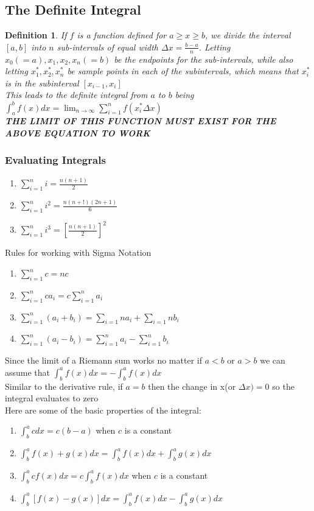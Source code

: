 \documentclass[10pt,a4paper]{article}
\newtheorem{definition}{Definition}
\begin{document}
	\subsection{The Definite Integral}
	\begin{definition}
		If $f$ is a function defined for $a\geq x \geq b$, we divide the interval $[a,b]$ into $n$ sub-intervals of equal width $\Delta{x} = \frac{b-a}{n}$. Letting $x_{0}(=a),x_{1}, x_{2}, x_{n}(=b)$ be the endpoints for the sub-intervals, while also letting $x_{1}^{*} , x_{2}^{*} , x_{n}^{*}$ be sample points in each of the subintervals, which means that $x_{i}^{*}$ is in the subinterval $[x_{i-1}, x_{i}]$
		\\			This leads to the definite integral from $a$ to $b$ being $\int_{a}^{b} f(x)dx = \lim_{n \rightarrow \infty}{\sum_{i=1}^{n}{f(x_{i}^{*}\Delta{x})}}$
		\\			\textbf{THE LIMIT OF THIS FUNCTION MUST EXIST FOR THE ABOVE EQUATION TO WORK}
	\end{definition}
	
	\subsubsection{Evaluating Integrals}
	\begin{enumerate}
		\item $\sum_{i=1}^{n}{i} = \frac{n(n+1)}{2}$
		\item $\sum_{i=1}^{n}{i^{2}} = \frac{n(n+!)(2n+1)}{6}$
		\item $\sum_{i=1}^{n}{i^{3}} = [\frac{n(n+1)}{2}]^{2}$
	\end{enumerate}
	Rules for working with Sigma Notation
	\begin{enumerate}
		\item $\sum_{i=1}^{n}{c} = nc$
		\item $\sum_{i=1}^{n}{ca_{i}} = c\sum_{i=1}^{n}{a_{i}}$
		\item $\sum_{i=1}^{n}{(a_{i}+b_{i})} = \sum_{i=1}{n}{a_{i}} + \sum_{i=1}{n}{b_{i}}$
		\item $\sum_{i=1}^{n}{(a_{i}-b_{i})} = \sum_{i=1}^{n}{a_{i}} - \sum_{i=1}^{n}{b_{i}}$
	\end{enumerate}
			Since the limit of a Riemann sum works no matter if $a<b$ or $a>b$ we can assume that $\int_{b}^{a}{f(x)dx} = -\int_{b}^{a}{f(x)dx}$
	\\			Similar to the derivative rule, if $a=b$ then the change in x(or $\Delta{x})=0$ so the integral evaluates to zero
	\\			Here are some of the basic properties of the integral:
	\begin{enumerate}
		\item $\int_{b}^{a}{c dx} = c(b-a)$ when $c$ is a constant
		\item $\int_{b}^{a}{f(x)+g(x)}dx = \int_{b}^{a}{f(x)dx} + \int_{b}^{a}{g(x)dx}$
		\item $\int_{b}^{a}{cf(x)dx} = c\int_{b}^{a}{f(x)dx}$ when $c$ is a constant
		\item $\int_{b}^{a}{[f(x)-g(x)]dx} = \int_{b}^{a}{f(x)dx} - \int_{b}^{a}{g(x)dx}$
	\end{enumerate}
\end{document}
